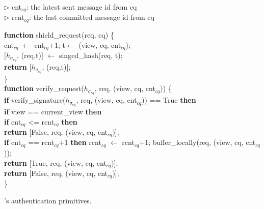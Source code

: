 \begin{algorithm}[t]
\SetAlgoLined
\small


$\triangleright$ cnt$_{cq}$: the latest sent message id from  cq\\$\triangleright$ rcnt$_{cq}$: the last committed message id from cq



\textbf{function} shield\_request(req, cq) \{ \\
\Indp
cnt$_{cq}$ $\leftarrow$ cnt$_{cq}$+1; t$\leftarrow$ (view, cq, cnt$_{cq}$);\\
$[$$h_{\sigma_{cq}}$, (req,t)$]$  $\leftarrow$ singed\_hash(req, t);\\
\textbf{return} $[$$h_{\sigma_{cq}}$, (req,t)$]$;\\
\Indm
\} \\



\textbf{function} verify\_request($h_{\sigma_{cq}}$, req, (view, cq, cnt$_{cq}$)) \{ \\
\Indp
    \textbf{if} verify\_signature($h_{\sigma_{cq}}$, req, (view, cq, cnt$_{cq}$)) == True \textbf{then}\\
    \Indp
        \textbf{if} view == current\_view \textbf{then}\\
        \Indp
            \textbf{if} cnt$_{cq}$ <= rcnt$_{cq}$ \textbf{then}\\
            \Indp
                \textbf{return} [False, req, (view, cq, cnt$_{cq}$)]; \\
            \Indm
            \textbf{if} cnt$_{cq}$ == rcnt$_{cq}$+1 \textbf{then} rcnt$_{cq}$ $\leftarrow$ rcnt$_{cq}$+1;
            buffer\_locally(req, (view, cq, cnt$_{cq}$));\\
                \textbf{return} [True, req, (view, cq, cnt$_{cq}$)]; \\
            
        \Indm
    \Indm
    \textbf{return} [False, req, (view, cq, cnt$_{cq}$)]; \\

\Indm
\} \\
\vspace{-1pt}
\caption{\projecttitle{}'s authentication primitives.}
\vspace{-3pt}
\label{algo:primitives}
\end{algorithm}




